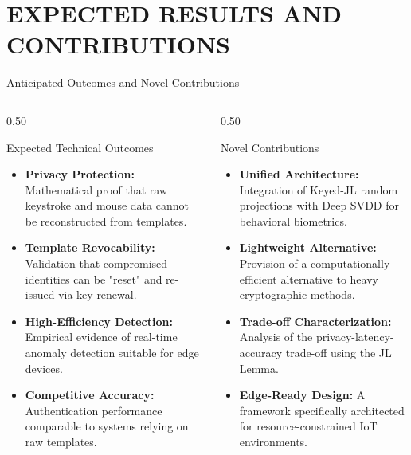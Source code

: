 
\section{EXPECTED RESULTS AND CONTRIBUTIONS}

\begin{frame}{Anticipated Outcomes and Novel Contributions}
   \vspace{-1.5em}
    \begin{columns}[T]
        \begin{column}{0.50\textwidth}
            \begin{block}{Expected Technical Outcomes}
                \fontsize{8.5pt}{10.5pt}\selectfont
                \begin{itemize}
                    \setlength{\itemsep}{6pt}
                    \item \textbf{Privacy Protection:} Mathematical proof that raw keystroke and mouse data cannot be reconstructed from templates.
                    \item \textbf{Template Revocability:} Validation that compromised identities can be "reset" and re-issued via key renewal.
                    \item \textbf{High-Efficiency Detection:} Empirical evidence of real-time anomaly detection suitable for edge devices.
                    \item \textbf{Competitive Accuracy:} Authentication performance comparable to systems relying on raw templates.
                \end{itemize}
            \end{block}
        \end{column}

        \begin{column}{0.50\textwidth}
            \begin{block}{Novel Contributions}
                \fontsize{8.5pt}{10.5pt}\selectfont
                \begin{itemize}
                    \setlength{\itemsep}{6pt}
                    \item \textbf{Unified Architecture:} Integration of Keyed-JL random projections with Deep SVDD for behavioral biometrics.
                    \item \textbf{Lightweight Alternative:} Provision of a computationally efficient alternative to heavy cryptographic methods.
                    \item \textbf{Trade-off Characterization:} Analysis of the privacy-latency-accuracy trade-off using the JL Lemma.
                    \item \textbf{Edge-Ready Design:} A framework specifically architected for resource-constrained IoT environments.
                \end{itemize}
            \end{block}
        \end{column}
    \end{columns}
\end{frame}